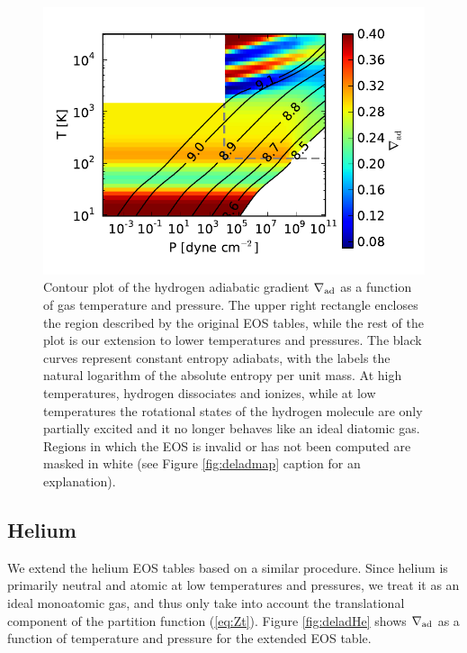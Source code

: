 \documentclass[apj]{emulateapj}
\newcommand{\delad}{\nabla_{\rm ad}}
\begin{document}
\begin{figure}[h!]
\centering
\includegraphics[scale=.8]{../../figs/ModelAtmospheres/RadSelfGravRealEOS/PaperFigs/delad_S_H.pdf}
\caption{Contour plot of the hydrogen adiabatic gradient $\delad$ as a function of gas temperature and pressure. The upper right rectangle encloses the region described by the original \citet{saumon95} EOS tables, while the rest of the plot is our extension to lower temperatures and pressures. The black curves represent constant entropy adiabats, with the labels the natural logarithm of the absolute entropy per unit mass. At high temperatures, hydrogen dissociates and ionizes, while at low temperatures the rotational states of the hydrogen molecule are only partially excited and it no longer behaves like an ideal diatomic gas. Regions in which the EOS is invalid or has not been computed are masked in white (see Figure \ref{fig:deladmap} caption for an explanation).}
\label{fig:deladH}
\end{figure}

\subsection{Helium}

We extend the helium EOS tables based on a similar procedure. Since helium is primarily neutral and atomic at low temperatures and pressures, we treat it as an ideal monoatomic gas, and thus only take into account the translational component of the partition function (\ref{eq:Zt}). Figure \ref{fig:deladHe} shows $\delad$ as a function of temperature and pressure for the extended EOS table. %
\end{document}
